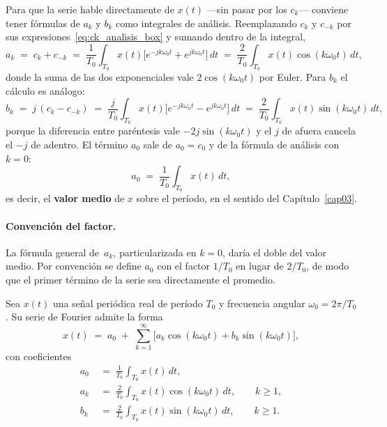 \documentclass[class=book, crop=false]{standalone}
\begin{document}
Para que la serie hable directamente de $x(t)$ ---sin pasar por los
$c_k$--- conviene tener fórmulas de $a_k$ y $b_k$ como integrales de
análisis. Reemplazando $c_k$ y $c_{-k}$ por sus
expresiones~\eqref{eq:ck_analisis_box} y sumando dentro de la
integral,
\begin{equation*}
    a_k \;=\; c_k + c_{-k}
        \;=\; \frac{1}{T_0}\int_{T_0} x(t)
            \bigl[e^{-jk\omega_0 t} + e^{jk\omega_0 t}\bigr]\,dt
        \;=\; \frac{2}{T_0}\int_{T_0} x(t)\cos(k\omega_0 t)\,dt,
\end{equation*}
donde la suma de las dos exponenciales vale $2\cos(k\omega_0 t)$ por
Euler. Para $b_k$ el cálculo es análogo:
\begin{equation*}
    b_k \;=\; j\,(c_k - c_{-k})
        \;=\; \frac{j}{T_0}\int_{T_0} x(t)
            \bigl[e^{-jk\omega_0 t} - e^{jk\omega_0 t}\bigr]\,dt
        \;=\; \frac{2}{T_0}\int_{T_0} x(t)\sin(k\omega_0 t)\,dt,
\end{equation*}
porque la diferencia entre paréntesis vale $-2j\sin(k\omega_0 t)$ y
el $j$ de afuera cancela el $-j$ de adentro. El término $a_0$ sale
de $a_0 = c_0$ y de la fórmula de análisis con $k = 0$:
\begin{equation*}
    a_0 \;=\; \frac{1}{T_0}\int_{T_0} x(t)\,dt,
\end{equation*}
es decir, el \textbf{valor medio} de $x$ sobre el período, en el
sentido del Capítulo~\ref{cap03}.

\paragraph{Convención del factor.}
La fórmula general de~$a_k$, particularizada en $k = 0$, daría el
doble del valor medio. Por convención se define $a_0$ con el factor
$1/T_0$ en lugar de $2/T_0$, de modo que el primer término de la
serie sea directamente el promedio.

\begin{resultado}
Sea $x(t)$ una señal periódica real de período $T_0$ y frecuencia
angular $\omega_0 = 2\pi/T_0$. Su serie de Fourier admite la forma
\begin{equation}
    x(t) \;=\; a_0 \;+\; \sum_{k=1}^{\infty}
        \bigl[a_k\cos(k\omega_0 t) + b_k\sin(k\omega_0 t)\bigr],
    \label{eq:sf_trig_box}
\end{equation}
con coeficientes
\begin{align}
    a_0 &\;=\; \frac{1}{T_0}\int_{T_0} x(t)\,dt,
        \label{eq:trig_a0} \\[2pt]
    a_k &\;=\; \frac{2}{T_0}\int_{T_0} x(t)\cos(k\omega_0 t)\,dt,
        \qquad k \geq 1, \label{eq:trig_ak} \\[2pt]
    b_k &\;=\; \frac{2}{T_0}\int_{T_0} x(t)\sin(k\omega_0 t)\,dt,
        \qquad k \geq 1. \label{eq:trig_bk}
\end{align}
\end{resultado}
\end{document}
